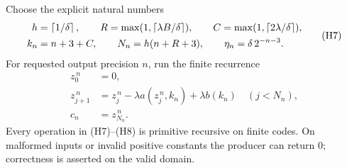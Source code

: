 Choose the explicit natural numbers
\[
\begin{split}
h&=\left\lceil 1/\delta\right\rceil,\qquad
R=\max(1,\left\lceil \lambda B/\delta\right\rceil),\qquad
C=\max(1,\left\lceil 2\lambda/\delta\right\rceil),\\
k_n&=n+3+C,\qquad N_n=h(n+R+3),\qquad
\eta_n=\delta\,2^{-n-3}.
\end{split}
\tag{H7}
\]
For requested output precision \(n\), run the finite recurrence
\[
\begin{split}
 z^{\,n}_0&=0,\\
 z^{\,n}_{j+1}
   &=z^{\,n}_j-\lambda a(z^{\,n}_j,k_n)+\lambda b(k_n)
       \quad(j<N_n),\\
 c_n&=z^{\,n}_{N_n}.
\end{split}
\tag{H8}
\]
Every operation in (H7)--(H8) is primitive recursive on finite codes.
On malformed inputs or invalid positive constants the producer can
return \(0\); correctness is asserted on the valid domain.

